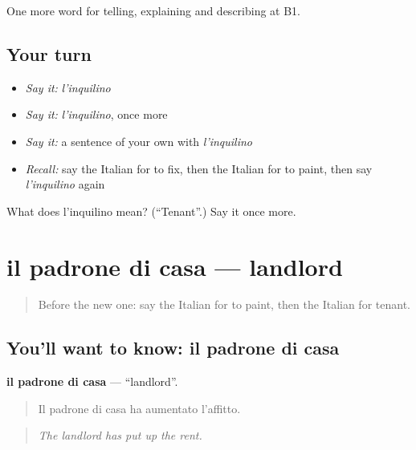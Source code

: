 \begin{grammarlens}[title={What you've built}]
One more word for telling, explaining and describing at B1.
\end{grammarlens}

\subsection*{Your turn}
\begin{itemize}
\raggedright
  \item \emph{Say it:} \emph{l'inquilino}
  \item \emph{Say it:} \emph{l'inquilino}, once more
  \item \emph{Say it:} a sentence of your own with \emph{l'inquilino}
  \item \emph{Recall:} say the Italian for to fix, then the Italian for to paint, then say \emph{l'inquilino} again
\end{itemize}

\begin{tcolorbox}[breakable,colback=teal!4,colframe=teal!35!black,title={Before you move on}]
What does l'inquilino mean? (\textquotedblleft{}Tenant\textquotedblright{}.) Say it once more.
\end{tcolorbox}
\section[il padrone di casa]{il padrone di casa — landlord}

\label{lesson:IT-C536-padrone-di-casa}



\begin{quote}
Before the new one: say the Italian for to paint, then the Italian for tenant.
\end{quote}

\subsection*{You'll want to know: il padrone di casa}
\textbf{il padrone di casa} — \textquotedblleft{}landlord\textquotedblright{}.

\begin{quote}
Il padrone di casa ha aumentato l'affitto.
\end{quote}

\begin{quote}
\emph{The landlord has put up the rent.}
\end{quote}

